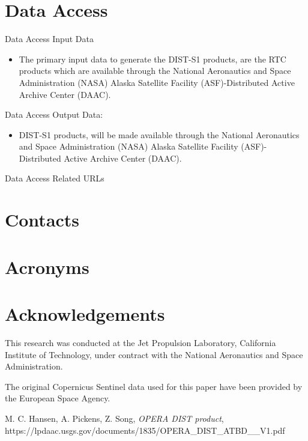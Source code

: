 \documentclass[11pt]{article}
\begin{document}


\section{Data Access}
Data Access Input Data
\begin{itemize}
\item The primary input data to generate the DIST-S1 products,
are the RTC products which are available through the National
Aeronautics and Space Administration (NASA)
Alaska Satellite Facility (ASF)-Distributed Active Archive Center (DAAC).
\end{itemize}

Data Access Output Data:

\begin{itemize}
\item DIST-S1 products, will be made available through the National
Aeronautics and Space Administration (NASA)
Alaska Satellite Facility (ASF)-Distributed Active Archive Center (DAAC).
\end{itemize}
Data Access Related URLs

\section{Contacts}

% 
\section{Acronyms}



\section{Acknowledgements}
This research was conducted at the Jet Propulsion Laboratory,
California Institute of Technology, under contract with
the National Aeronautics and Space Administration.

The original Copernicus Sentinel data used for this paper have been provided by the European Space Agency.

\begin{thebibliography}{3}

M. C. Hansen, A. Pickens, Z. Song,
\emph{OPERA DIST product},
https://lpdaac.usgs.gov/documents/1835/OPERA\_DIST\_ATBD\_\_V1.pdf
\end{thebibliography}
\end{document}
